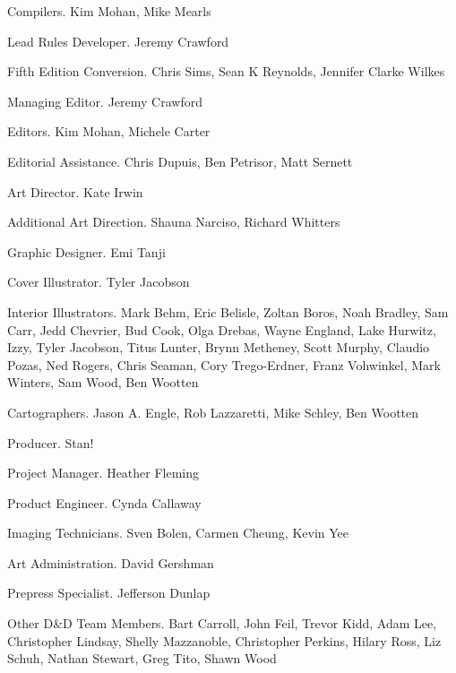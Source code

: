 \documentclass[10pt,a4paper,twoside,bg=print,twocolumn,openany,nodeprecatedcode]{dndbook}
\begin{document}
\begin{description}
\begin{multicols}{2}
\item[Compilers.]
Kim Mohan, Mike Mearls

\item[Lead Rules Developer.]
Jeremy Crawford

\item[Fifth Edition Conversion.]
Chris Sims, Sean K Reynolds, Jennifer Clarke Wilkes

\item[Managing Editor.]
Jeremy Crawford

\item[Editors.]
Kim Mohan, Michele Carter

\item[Editorial Assistance.]
Chris Dupuis, Ben Petrisor, Matt Sernett

\item[Art Director.]
Kate Irwin

\item[Additional Art Direction.]
Shauna Narciso, Richard Whitters

\item[Graphic Designer.]
Emi Tanji

\item[Cover Illustrator.]
Tyler Jacobson

\item[Interior Illustrators.]
Mark Behm, Eric Belisle, Zoltan Boros, Noah Bradley, Sam Carr, Jedd Chevrier, Bud Cook, Olga Drebas, Wayne England, Lake Hurwitz, Izzy, Tyler Jacobson, Titus Lunter, Brynn Metheney, Scott Murphy, Claudio Pozas, Ned Rogers, Chris Seaman, Cory Trego-Erdner, Franz Vohwinkel, Mark Winters, Sam Wood, Ben Wootten

\item[Cartographers.]
Jason A. Engle, Rob Lazzaretti, Mike Schley, Ben Wootten

\item[Producer.]
Stan!

\item[Project Manager.]
Heather Fleming

\item[Product Engineer.]
Cynda Callaway

\item[Imaging Technicians.]
Sven Bolen, Carmen Cheung, Kevin Yee

\item[Art Administration.]
David Gershman

\item[Prepress Specialist.]
Jefferson Dunlap

\item[Other D\&D Team Members.]
Bart Carroll, John Feil, Trevor Kidd, Adam Lee, Christopher Lindsay, Shelly Mazzanoble, Christopher Perkins, Hilary Ross, Liz Schuh, Nathan Stewart, Greg Tito, Shawn Wood

\end{multicols}

\end{description}
\end{document}
